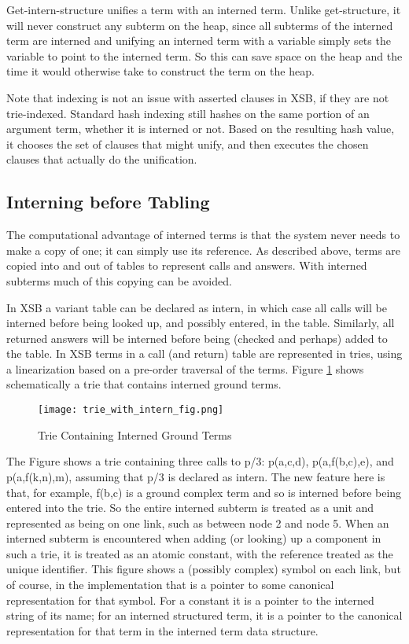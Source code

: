 \documentclass{llncs}
\begin{document}
Get-intern-structure unifies a term with an interned term.  Unlike
get-structure, it will never construct any subterm on the heap, since
all subterms of the interned term are interned and unifying an
interned term with a variable simply sets the variable to point to the
interned term.  So this can save space on the heap and the time it
would otherwise take to construct the term on the heap.

Note that indexing is not an issue with asserted clauses in XSB, if
they are not trie-indexed.  Standard hash indexing still hashes on the
same portion of an argument term, whether it is interned or not.
Based on the resulting hash value, it chooses the set of clauses that
might unify, and then executes the chosen clauses that actually do the
unification.

\subsection{Interning before Tabling}\label{int-bef-tab}
The computational advantage of interned terms is that the system never
needs to make a copy of one; it can simply use its reference.  As
described above, terms are copied into and out of tables to represent
calls and answers.  With interned subterms much of this copying can be
avoided.

In XSB a variant table can be declared as intern, in which case all
calls will be interned before being looked up, and possibly entered,
in the table.  Similarly, all returned answers will be interned before
being (checked and perhaps) added to the table. In XSB terms in a call
(and return) table are represented in tries, using a linearization
based on a pre-order traversal of the terms.  Figure
\ref{fig:interntrie} shows schematically a trie that contains 
interned ground terms.

\begin{figure}[ht]
\begin{center}
\texttt{[image: trie\_with\_intern\_fig.png]}
\end{center}
    \caption{Trie Containing Interned Ground Terms\label{fig:interntrie}}
\end{figure}

The Figure shows a trie containing three calls to p/3: p(a,c,d),
p(a,f(b,c),e), and p(a,f(k,n),m), assuming that p/3 is declared as
intern.  The new feature here is that, for example, f(b,c) is a ground
complex term and so is interned before being entered into the trie.
So the entire interned subterm is treated as a unit and represented as
being on one link, such as between node 2 and node 5.  When an
interned subterm is encountered when adding (or looking) up a
component in such a trie, it is treated as an atomic constant, with
the reference treated as the unique identifier.  This figure shows a
(possibly complex) symbol on each link, but of course, in the
implementation that is a pointer to some canonical representation for
that symbol.  For a constant it is a pointer to the interned string of
its name; for an interned structured term, it is a pointer to the
canonical representation for that term in the interned term data
structure.
\end{document}
